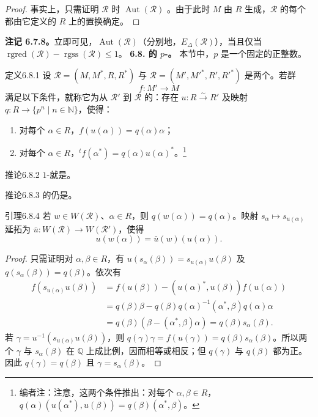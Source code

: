 \begin{proof}
事实上，只需证明 $\mathscr R$ 时 $\operatorname{Aut}(\mathscr R)$ 。由于此时 $M$ 由 $R$ 生成，$\mathscr R$ 的每个都由它定义的 $R$ 上的置换确定。
\end{proof}
\textbf{注记 6.7.8。}立即可见，$\operatorname{Aut}(\mathscr R)$（分别地，$E_\Delta(\mathscr R)$），当且仅当 $\operatorname{rgred}(\mathscr R)-\operatorname{rgss}(\mathscr R)\leq1$。
\textbf{6.8. 的 $p$-。}
本节中，$p$ 是一个固定的正整数。
\begin{SGAresult}{定义}{6.8.1}
设 $\mathscr R=(M,M^*,R,R^*)$ 与 $\mathscr R=(M',M'^*,R',R'^*)$ 是两个。若群
\[f:M'\longrightarrow M\]
满足以下条件，就称它为从 $\mathscr R'$ 到 $\mathscr R$ 的：存在 $u:R\xrightarrow\sim R'$ 及映射 $q:R\to\{p^n\mid n\in\mathbb N\}$，使得：
\begin{enumerate}
\item[(i)] 对每个 $\alpha\in R$，$f(u(\alpha))=q(\alpha)\alpha$；
\item[(ii)] 对每个 $\alpha\in R$，${}^tf(\alpha^*)=q(\alpha)u(\alpha)^*$。\footnote{编者注：注意，这两个条件推出：对每个 $\alpha,\beta\in R$，$q(\alpha)(u(\alpha^*),u(\beta))=q(\beta)(\alpha^*,\beta)$。}
\end{enumerate}
\end{SGAresult}
\begin{SGAresult}{推论}{6.8.2}
$1$-就是。
\end{SGAresult}
\begin{SGAresult}{推论}{6.8.3}
的仍是。
\end{SGAresult}
\begin{SGAresult}{引理}{6.8.4}
若 $w\in W(\mathscr R)$、$\alpha\in R$，则 $q(w(\alpha))=q(\alpha)$。映射 $s_\alpha\mapsto s_{u(\alpha)}$ 延拓为 $\bar u:W(\mathscr R)\to W(\mathscr R')$，使得
\[u(w(\alpha))=\bar u(w)(u(\alpha)).\]
\end{SGAresult}
\begin{proof}
只需证明对 $\alpha,\beta\in R$，有 $u(s_\alpha(\beta))=s_{u(\alpha)}u(\beta)$ 及 $q(s_\alpha(\beta))=q(\beta)$。依次有
\begin{align*}
f(s_{u(\alpha)}u(\beta))&=f(u(\beta))-(u(\alpha)^*,u(\beta))f(u(\alpha))\\
&=q(\beta)\beta-q(\beta)q(\alpha)^{-1}(\alpha^*,\beta)q(\alpha)\alpha\\
&=q(\beta)(\beta-(\alpha^*,\beta)\alpha)=q(\beta)s_\alpha(\beta).
\end{align*}
若 $\gamma=u^{-1}(s_{u(\alpha)}u(\beta))$，则 $q(\gamma)\gamma=f(u(\gamma))=q(\beta)s_\alpha(\beta)$。所以两个 $\gamma$ 与 $s_\alpha(\beta)$ 在 $\mathbb Q$ 上成比例，因而相等或相反；但 $q(\gamma)$ 与 $q(\beta)$ 都为正。因此 $q(\gamma)=q(\beta)$ 且 $\gamma=s_\alpha(\beta)$。
\end{proof}
